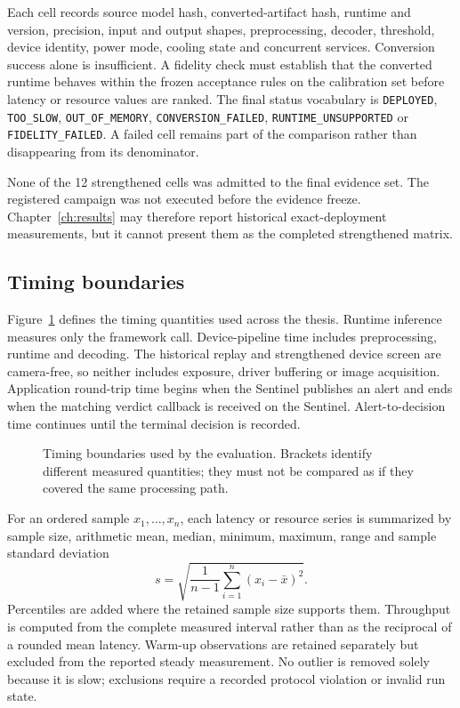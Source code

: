 Each cell records source model hash, converted-artifact hash, runtime and
version, precision, input and output shapes, preprocessing, decoder, threshold,
device identity, power mode, cooling state and concurrent services. Conversion
success alone is insufficient. A fidelity check must establish that the
converted runtime behaves within the frozen acceptance rules on the calibration
set before latency or resource values are ranked. The final status vocabulary
is \texttt{DEPLOYED}, \texttt{TOO\_SLOW}, \texttt{OUT\_OF\_MEMORY},
\texttt{CONVERSION\_FAILED}, \texttt{RUNTIME\_UNSUPPORTED} or
\texttt{FIDELITY\_FAILED}. A failed cell remains part of the comparison rather
than disappearing from its denominator.

None of the 12 strengthened cells was admitted to the final evidence set. The
registered campaign was not executed before the evidence freeze.
Chapter~\ref{ch:results} may therefore report historical exact-deployment
measurements, but it cannot present them as the completed strengthened matrix.

\subsection{Timing boundaries}

Figure~\ref{fig:timing-boundaries} defines the timing quantities used across
the thesis. Runtime inference measures only the framework call. Device-pipeline
time includes preprocessing, runtime and decoding. The historical replay and
strengthened device screen are camera-free, so neither includes exposure,
driver buffering or image acquisition. Application round-trip time begins when
the Sentinel publishes an alert and ends when the matching verdict callback is
received on the Sentinel. Alert-to-decision time continues until the terminal
decision is recorded.

\begin{figure}[H]
  \centering
  \resizebox{\textwidth}{!}{}
  \caption{Timing boundaries used by the evaluation. Brackets identify
  different measured quantities; they must not be compared as if they covered
  the same processing path.}
  \label{fig:timing-boundaries}
\end{figure}

For an ordered sample \(x_1,\ldots,x_n\), each latency or resource series is
summarized by sample size, arithmetic mean, median, minimum, maximum, range and
sample standard deviation
\begin{equation}
  s=\sqrt{\frac{1}{n-1}\sum_{i=1}^{n}(x_i-\bar{x})^2}.
  \label{eq:method-sd}
\end{equation}
Percentiles are added where the retained sample size supports them. Throughput
is computed from the complete measured interval rather than as the reciprocal
of a rounded mean latency. Warm-up observations are retained separately but
excluded from the reported steady measurement. No outlier is removed solely
because it is slow; exclusions require a recorded protocol violation or
invalid run state.

